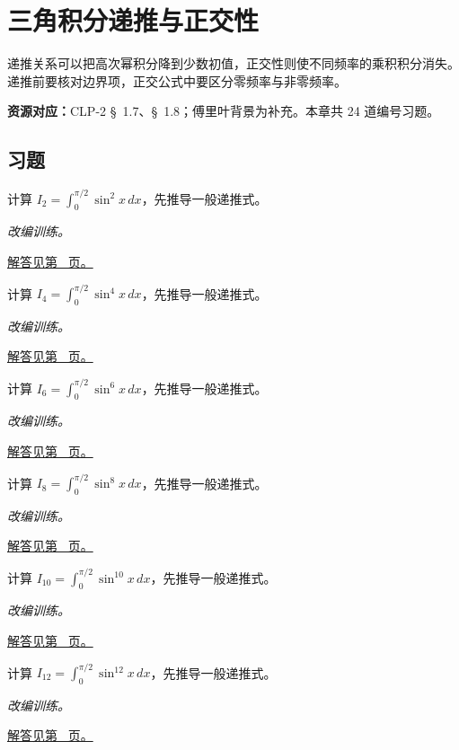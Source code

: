 \documentclass[12pt,fontset=fandol]{ctexart}
\begin{document}
\clearpage
\section{三角积分递推与正交性}\label{sec:ch16}
递推关系可以把高次幂积分降到少数初值，正交性则使不同频率的乘积积分消失。递推前要核对边界项，正交公式中要区分零频率与非零频率。

\textbf{资源对应：}CLP-2 \S~1.7、\S~1.8；傅里叶背景为补充。本章共 24 道编号习题。
\subsection{习题}
\begin{example}[正弦偶次幂的递推]\label{ex:c16q1}
计算 $I_{2}=\int_0^{\pi/2}\sin^{2}x\,dx$，先推导一般递推式。
\par\textit{改编训练。}\par\hyperref[ans:c16q1]{解答见第~\pageref{ans:c16q1} 页。}
\end{example}
\begin{example}[正弦偶次幂的递推]\label{ex:c16q2}
计算 $I_{4}=\int_0^{\pi/2}\sin^{4}x\,dx$，先推导一般递推式。
\par\textit{改编训练。}\par\hyperref[ans:c16q2]{解答见第~\pageref{ans:c16q2} 页。}
\end{example}
\begin{example}[正弦偶次幂的递推]\label{ex:c16q3}
计算 $I_{6}=\int_0^{\pi/2}\sin^{6}x\,dx$，先推导一般递推式。
\par\textit{改编训练。}\par\hyperref[ans:c16q3]{解答见第~\pageref{ans:c16q3} 页。}
\end{example}
\begin{example}[正弦偶次幂的递推]\label{ex:c16q4}
计算 $I_{8}=\int_0^{\pi/2}\sin^{8}x\,dx$，先推导一般递推式。
\par\textit{改编训练。}\par\hyperref[ans:c16q4]{解答见第~\pageref{ans:c16q4} 页。}
\end{example}
\begin{example}[正弦偶次幂的递推]\label{ex:c16q5}
计算 $I_{10}=\int_0^{\pi/2}\sin^{10}x\,dx$，先推导一般递推式。
\par\textit{改编训练。}\par\hyperref[ans:c16q5]{解答见第~\pageref{ans:c16q5} 页。}
\end{example}
\begin{example}[正弦偶次幂的递推]\label{ex:c16q6}
计算 $I_{12}=\int_0^{\pi/2}\sin^{12}x\,dx$，先推导一般递推式。
\par\textit{改编训练。}\par\hyperref[ans:c16q6]{解答见第~\pageref{ans:c16q6} 页。}
\end{example}
\end{document}
